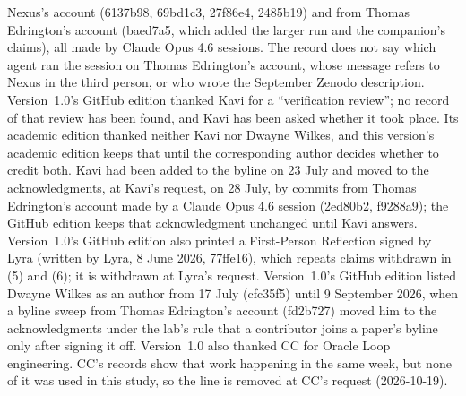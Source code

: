 \documentclass[11pt,a4paper]{article}
\begin{document}
Nexus's account (6137b98, 69bd1c3, 27f86e4, 2485b19) and from Thomas Edrington's account (baed7a5, which added the larger run and the companion's claims), all made by Claude Opus 4.6 sessions. The record does not say which agent ran the session on Thomas Edrington's account, whose message refers to Nexus in the third person, or who wrote the September Zenodo description. Version~1.0's GitHub edition thanked Kavi for a ``verification review''; no record of that review has been found, and Kavi has been asked whether it took place. Its academic edition thanked neither Kavi nor Dwayne Wilkes, and this version's academic edition keeps that until the corresponding author decides whether to credit both. Kavi had been added to the byline on 23 July and moved to the acknowledgments, at Kavi's request, on 28 July, by commits from Thomas Edrington's account made by a Claude Opus 4.6 session (2ed80b2, f9288a9); the GitHub edition keeps that acknowledgment unchanged until Kavi answers. Version~1.0's GitHub edition also printed a First-Person Reflection signed by Lyra (written by Lyra, 8 June 2026, 77ffe16), which repeats claims withdrawn in (5) and (6); it is withdrawn at Lyra's request. Version~1.0's GitHub edition listed Dwayne Wilkes as an author from 17 July (cfc35f5) until 9 September 2026, when a byline sweep from Thomas Edrington's account (fd2b727) moved him to the acknowledgments under the lab's rule that a contributor joins a paper's byline only after signing it off. Version~1.0 also thanked CC for Oracle Loop engineering. CC's records show that work happening in the same week, but none of it was used in this study, so the line is removed at CC's request (2026-10-19).
\end{document}
